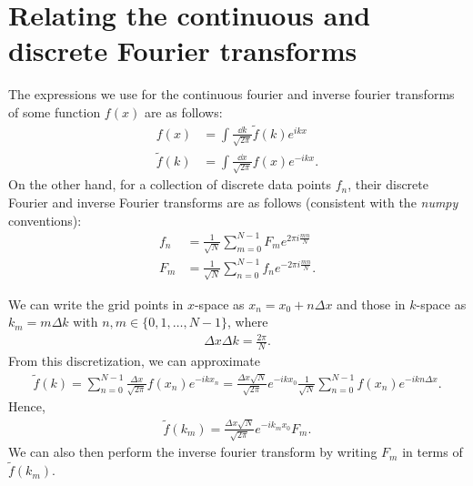 \section{Relating the continuous and discrete Fourier transforms}
\label{app:relating-the-continuous-and-discrete-fourier-transforms}

The expressions we use for the continuous fourier and inverse fourier transforms of some function $f(x)$ are as follows:
\begin{align}
    f(x) &= \int \frac{\dd{k}}{\sqrt{2 \pi}} \tilde{f}(k) e^{i k x} \\
    \tilde{f}(k) &= \int \frac{\dd{x}}{\sqrt{2 \pi}} f(x) e^{-ikx}
.\end{align}
On the other hand, for a collection of discrete data points $f_{n}$, their discrete Fourier and inverse Fourier transforms are as follows (consistent with the \textit{numpy} conventions):
\begin{align}
    f_{n} &= \frac{1}{\sqrt{N}} \sum_{m=0}^{N-1} F_{m} e^{2 \pi i \frac{m n}{N}} \\
    F_{m} &= \frac{1}{\sqrt{N}} \sum_{n=0}^{N-1} f_{n} e^{-2 \pi i \frac{m n}{N}}
.\end{align}

We can write the grid points in $x$-space as $x_{n} = x_0 + n \Delta x$ and those in $k$-space as $k_{m} = m \Delta k$ with $n,m \in \{ 0,1,\ldots,N-1 \}$, where
\begin{align}
    \Delta x \Delta k = \frac{2 \pi}{N}
.\end{align}
From this discretization, we can approximate
\begin{align}
    \tilde{f}(k) = \sum_{n=0}^{N-1} \frac{\Delta x}{\sqrt{2 \pi}} f(x_{n}) e^{-i k x_{n}} = \frac{\Delta x \sqrt{N}}{\sqrt{2 \pi}} e^{-i k x_0} \frac{1}{\sqrt{N}} \sum_{n=0}^{N-1} f(x_{n}) e^{-i k n \Delta x}
.\end{align}
Hence,
\begin{align}
    \tilde{f}(k_{m}) = \frac{\Delta x \sqrt{N}}{\sqrt{2 \pi}} e^{-i k_{m} x_0} F_{m}
.\end{align}
We can also then perform the inverse fourier transform by writing $F_{m}$ in terms of $\tilde{f}(k_{m})$.


    

